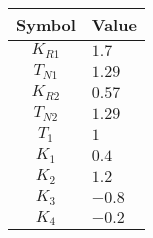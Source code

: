 \begin{tabular}{cl}
\hline
  Symbol  & Value   \\
\hline
 $K_{R1}$ & $1.7$   \\
 $T_{N1}$ & $1.29$  \\
 $K_{R2}$ & $0.57$  \\
 $T_{N2}$ & $1.29$  \\
 $T_{1}$  & $1$     \\
 $K_{1}$  & $0.4$   \\
 $K_{2}$  & $1.2$   \\
 $K_{3}$  & $-0.8$  \\
 $K_{4}$  & $-0.2$  \\
\hline
\end{tabular}